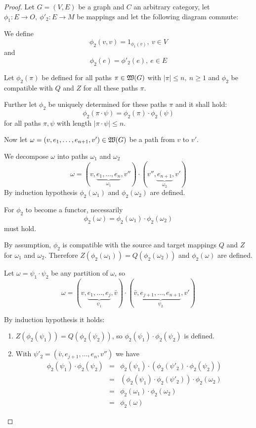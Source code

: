 \begin{proof}
Let $G = (V, E)$ be a graph and $C$ an arbitrary category, let $\phi_1 :
E \to O,\ \phi'_2 : E \to M$ be mappings and let the following diagram commute:

\begin{center}
\end{center}

We define 
\[ \phi_2(v,v) = 1_{\phi_1(v)},\ v \in V \] 
and 
\[ \phi_2(e) = \phi'_2(e),\ e \in E \]

Let $\phi_2(\pi)$ be defined for all paths $\pi \in \mbox{$\mathfrak{W}({G})$}$ with $|\pi|
\leq n,\ n \geq 1$ and $\phi_2$ be compatible with $Q$ and $Z$ for all these
paths $\pi$.

Further let $\phi_2$ be uniquely determined for these paths $\pi$ and it shall
hold:
\[ \phi_2(\pi \cdot \psi) = \phi_2(\pi) \cdot \phi_2(\psi) \]
for all paths $\pi, \psi$ with length $|\pi \cdot \psi| \leq n$.

Now let $\omega = (v, e_1, \ldots, e_{n+1}, v') \in \mbox{$\mathfrak{W}({G})$}$ be a path from
$v$ to $v'$.

We decompose $\omega$ into paths $\omega_1$ and $\omega_2$
\[ \omega = (v, \underbrace{e_1, \ldots, e_n}_{\omega_1}, v'') \cdot (v'',
\underbrace{e_{n+1}}_{\omega_2}, v') \]
By induction hypothesis $\phi_2(\omega_1)$ and $\phi_2(\omega_2)$ are defined.

For $\phi_2$ to become a functor, necessarily
\[ \phi_2(\omega) = \phi_2(\omega_1) \cdot \phi_2(\omega_2) \]
must hold.

By assumption, $\phi_2$ is compatible with the source and target mappings $Q$
and $Z$ for $\omega_1$ and $\omega_2$. Therefore $Z(\phi_2(\omega_1)) =
Q(\phi_2(\omega_2))$ and $\phi_2(\omega)$ are defined.

Let $\omega = \psi_1 \cdot \psi_2$ be any partition of $\omega$, so 
\[ \omega = (v, \underbrace{e_1, \ldots, e_j}_{\psi_1}, \bar{v}) \cdot (\bar{v},
\underbrace{e_{j+1}, \ldots, e_{n+1}}_{\psi_2}, v') \]

By induction hypothesis it holds:
\begin{enumerate}
  \item $Z(\phi_2(\psi_1)) = Q(\phi_2(\psi_2))$, so $\phi_2(\psi_1) \cdot
  \phi_2(\psi_2)$ is defined.
  \item With $\psi'_2 = (\bar{v}, e_{j+1}, \ldots, e_n, v'')$ we have
  \begin{eqnarray*}
  \phi_2(\psi_1) \cdot \phi_2(\psi_2) & = & \phi_2(\psi_1) \cdot
  (\phi_2(\psi'_2) \cdot \phi_2(\psi_2)) \\
  & = & (\phi_2(\psi_1) \cdot \phi_2(\psi'_2)) \cdot \phi_2(\omega_2) \\
  & = & \phi_2(\omega_1) \cdot \phi_2(\omega_2) \\
  & = & \phi_2(\omega)
  \end{eqnarray*}
\end{enumerate}


\end{proof}
